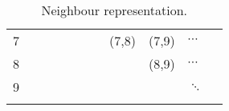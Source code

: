 \begin{table}[!htb]
\begin{tabular}{lllllllllll}
		7 &                               &                               &                               &                               &                               &                               & \cellcolor[HTML]{9B9B9B}(7,8) & \cellcolor[HTML]{C0C0C0}(7,9) & \cellcolor[HTML]{C0C0C0}$\cdots$ &  \\
		8 &                               &                               &                               &                               &                               &                               &                               & \cellcolor[HTML]{C0C0C0}(8,9) & \cellcolor[HTML]{C0C0C0}$\cdots$ &  \\
		9 &                               &                               &                               &                               &                               &                               &                               &                               & $\ddots$                         &  \\
		&                               &                               &                               &                               &                               &                               &                               &                               &                                  & 
	\end{tabular}
	\caption{Neighbour representation.}
	\label{tab:neighbours}
\end{table}